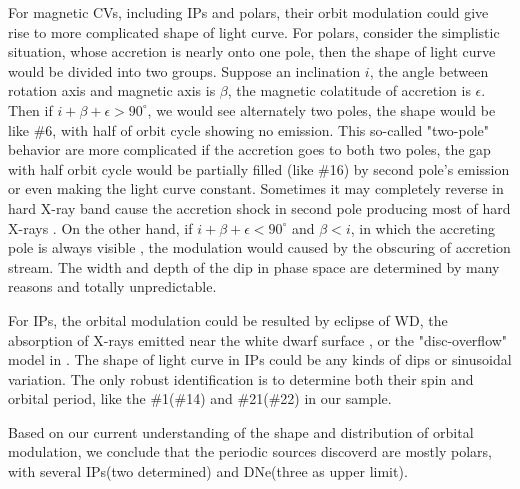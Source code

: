 \documentclass[fleqn,usenatbib]{mnras}
\begin{document}
For magnetic CVs, including IPs and polars, their orbit modulation could give rise to more complicated shape of light curve. For polars, consider the simplistic situation, whose accretion is nearly onto one pole, then the shape of light curve would be divided into two groups. Suppose an inclination $i$, the angle between rotation axis and magnetic axis is $\beta$, the magnetic colatitude of accretion is $\epsilon$. Then if $i+\beta+\epsilon > 90^{\circ}$, we would see alternately two poles, the shape would be like \#6, with half of orbit cycle showing no emission. This so-called "two-pole"  behavior are more complicated if the accretion goes to both two poles, the gap with half orbit cycle would be partially filled (like \#16) by second pole's emission or even making the light curve constant. Sometimes it may completely reverse in hard X-ray band cause the accretion shock in second pole producing most of hard X-rays \citep{1985A&A...148L..14H}. On the other hand, if $i+\beta+\epsilon < 90^{\circ}$ and $\beta < i$, in which the accreting pole is always visible , the modulation would caused by the obscuring of accretion stream. The width and depth of the dip in phase space are determined by many reasons and totally unpredictable. 

For IPs, the orbital modulation could be resulted by eclipse of WD, the absorption of X-rays emitted near the white
dwarf surface \citep{1993MNRAS.260..299H}, or the "disc-overflow" model in \citep{1996MNRAS.280..937N}. The shape of light curve in IPs could be any kinds of dips or sinusoidal variation. The only robust identification is to determine both their spin and orbital period, like the \#1(\#14) and \#21(\#22) in our sample.

Based on our current understanding of the shape and distribution of orbital modulation, we conclude that the periodic sources discoverd are mostly polars, with several IPs(two determined) and DNe(three as upper limit). 
\end{document}
